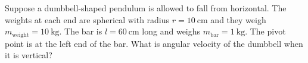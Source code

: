 \documentclass[../classical_mechanics.tex]{subfiles}
\begin{document}
            \begin{example}
                Suppose a dumbbell-shaped pendulum is allowed to fall from horizontal.
                The weights at each end are spherical with radius $r=\qty{10}{\centi\meter}$ and they weigh $m_\text{weight}=\qty{10}{\kilogram}$.
                The bar is $l=\qty{60}{\centi\meter}$ long and weighs $m_\text{bar}=\qty{1}{\kilogram}$.
                The pivot point is at the left end of the bar.
                What is angular velocity of the dumbbell when it is vertical?
                \begin{figure}[H]
                    \centering
                \end{figure}
                

\end{example}
\end{document}
